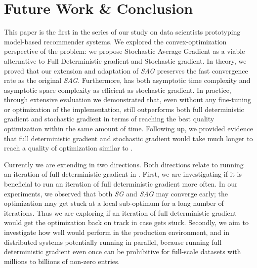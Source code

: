 \section{Future Work \& Conclusion}
This paper is the first in the series of our study on data scientists prototyping model-based recommender systems.  
We explored the convex-optimization perspective of the problem: we propose Stochastic Average Gradient as a viable alternative to Full Deterministic gradient and Stochastic gradient.  
In theory, we proved that our extension and adaptation of \emph{SAG} preserves the fast convergence rate as the original \emph{SAG}.  
Furthermore, \tool has both asymptotic time complexity and asymptotic space complexity as efficient as stochastic gradient.  
In practice, through extensive evaluation we demonstrated that, even without any fine-tuning or optimization of the implementation, 
\tool still outperforms both full deterministic gradient and stochastic gradient in terms of reaching the best quality optimization within the same amount of time.  
Following up, we provided evidence that full deterministic gradient and stochastic gradient would take much longer to reach a quality of optimization similar to \tool.

Currently we are extending \tool in two directions.  Both directions relate to running an iteration of full deterministic gradient in \tool.
First, we are investigating if it is beneficial to run an iteration of full deterministic gradient more often.  
In our experiments, we observed that both \emph{SG} and \emph{SAG} may converge early; the optimization may get stuck at a local sub-optimum for a long number of iterations.  
Thus we are exploring if an iteration of full deterministic gradient would get the optimization back on track in case \tool gets stuck.
Secondly, we aim to investigate how well \tool would perform in the production environment, and in distributed systems potentially running in parallel, because running full deterministic gradient even once can be prohibitive for full-scale datasets with millions to billions of non-zero entries.

